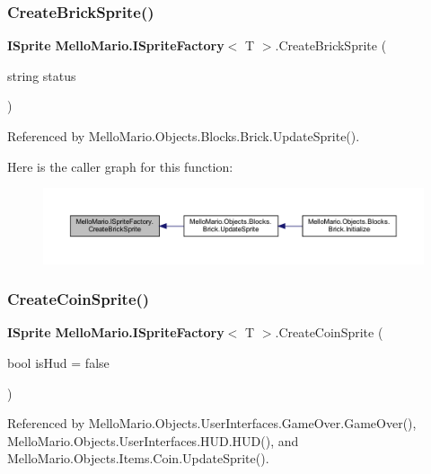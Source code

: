 \subsubsection{Create\+Brick\+Sprite()}
{\footnotesize\ttfamily \textbf{ I\+Sprite} \textbf{ Mello\+Mario.\+I\+Sprite\+Factory}$<$ T $>$.Create\+Brick\+Sprite (\begin{DoxyParamCaption}\item[{string}]{status }\end{DoxyParamCaption})}



Referenced by Mello\+Mario.\+Objects.\+Blocks.\+Brick.\+Update\+Sprite().

Here is the caller graph for this function\+:
\nopagebreak
\begin{figure}[H]
\begin{center}
\leavevmode
\includegraphics[width=350pt]{interfaceMelloMario_1_1ISpriteFactory_a3cd1380121d3af6469feda2a452d4a5f_icgraph}
\end{center}
\end{figure}
\mbox{\label{interfaceMelloMario_1_1ISpriteFactory_aa409bcc08b42988337574c533bcc4c8b}} 
\subsubsection{Create\+Coin\+Sprite()}
{\footnotesize\ttfamily \textbf{ I\+Sprite} \textbf{ Mello\+Mario.\+I\+Sprite\+Factory}$<$ T $>$.Create\+Coin\+Sprite (\begin{DoxyParamCaption}\item[{bool}]{is\+Hud = {\ttfamily false} }\end{DoxyParamCaption})}



Referenced by Mello\+Mario.\+Objects.\+User\+Interfaces.\+Game\+Over.\+Game\+Over(), Mello\+Mario.\+Objects.\+User\+Interfaces.\+H\+U\+D.\+H\+U\+D(), and Mello\+Mario.\+Objects.\+Items.\+Coin.\+Update\+Sprite().

